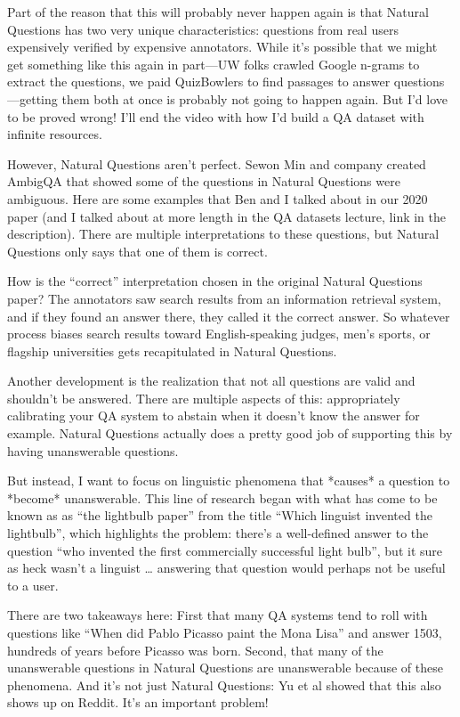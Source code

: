 Part of the reason that this will probably never happen again is that Natural Questions has two very unique characteristics: questions from real users expensively verified by expensive annotators.  While it’s possible that we might get something like this again in part—UW folks crawled Google n-grams to extract the questions, we paid QuizBowlers to find passages to answer questions—getting them both at once is probably not going to happen again.  But I’d love to be proved wrong!  I’ll end the video with how I’d build a QA dataset with infinite resources.

However, Natural Questions aren’t perfect.  Sewon Min and company created AmbigQA that showed some of the questions in Natural Questions were ambiguous.  Here are some examples that Ben and I talked about in our 2020 paper (and I talked about at more length in the QA datasets lecture, link in the description).  There are multiple interpretations to these questions, but Natural Questions only says that one of them is correct.  

How is the “correct” interpretation chosen in the original Natural Questions paper?  The annotators saw search results from an information retrieval system, and if they found an answer there, they called it the correct answer.  So whatever process biases search results toward English-speaking judges, men’s sports, or flagship universities gets recapitulated in Natural Questions.

Another development is the realization that not all questions are valid and shouldn’t be answered.  There are multiple aspects of this: appropriately calibrating your QA system to abstain when it doesn’t know the answer for example.  Natural Questions actually does a pretty good job of supporting this by having unanswerable questions.

But instead, I want to focus on linguistic phenomena that *causes* a question to *become* unanswerable.  This line of research began with what has come to be known as as “the lightbulb paper” from the title “Which linguist invented the lightbulb”, which highlights the problem: there’s a well-defined answer to the question “who invented the first commercially successful light bulb”, but it sure as heck wasn’t a linguist … answering that question would perhaps not be useful to a user.

There are two takeaways here: First that many QA systems tend to roll with questions like “When did Pablo Picasso paint the Mona Lisa” and answer 1503, hundreds of years before Picasso was born.  Second, that many of the unanswerable questions in Natural Questions are unanswerable because of these phenomena.  And it’s not just Natural Questions: Yu et al showed that this also shows up on Reddit.  It’s an important problem!

